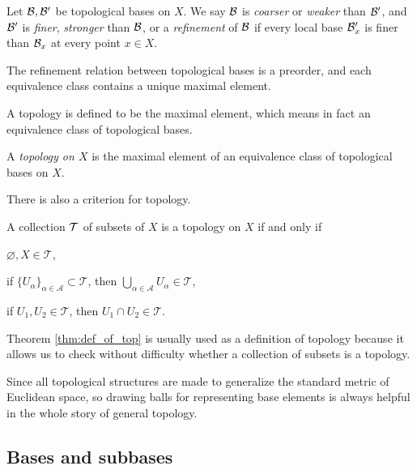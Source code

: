 \documentclass{../crs}
\begin{document}
\begin{defn}
Let $\mathcal{B},\mathcal{B}'$ be topological bases on $X$.
We say $\mathcal{B}$ is \emph{coarser} or \emph{weaker} than $\mathcal{B}'$, and $\mathcal{B}'$ is \emph{finer}, \emph{stronger} than $\mathcal{B}$, or a \emph{refinement} of $\mathcal{B}$ if every local base $\mathcal{B}'_x$ is finer than $\mathcal{B}_x$ at every point $x\in X$.
\end{defn}
\begin{prop}
The refinement relation between topological bases is a preorder, and each equivalence class contains a unique maximal element.
\end{prop}
\begin{pf}
\end{pf}

A topology is defined to be the maximal element, which means in fact an equivalence class of topological bases.

\begin{defn}
A \emph{topology on $X$} is the maximal element of an equivalence class of topological bases on $X$.
\end{defn}

There is also a criterion for topology.

\begin{thm}\label{thm:def_of_top}
A collection $\mathcal{T}$ of subsets of $X$ is a topology on $X$ if and only if
\begin{cond}
\item $\varnothing,X\in\mathcal{T}$,
\item if $\{U_\alpha\}_{\alpha\in\mathcal{A}}\subset\mathcal{T}$, then $\bigcup_{\alpha\in\mathcal{A}}U_\alpha\in\mathcal{T}$,
\item if $U_1,U_2\in\mathcal{T}$, then $U_1\cap U_2\in\mathcal{T}$.
\end{cond}
\end{thm}
\begin{pf}
\end{pf}
Theorem \ref{thm:def_of_top} is usually used as a definition of topology because it allows us to check without difficulty whether a collection of subsets is a topology.


Since all topological structures are made to generalize the standard metric of Euclidean space, so drawing balls for representing base elements is always helpful in the whole story of general topology.






\subsection{Bases and subbases}
\end{document}
